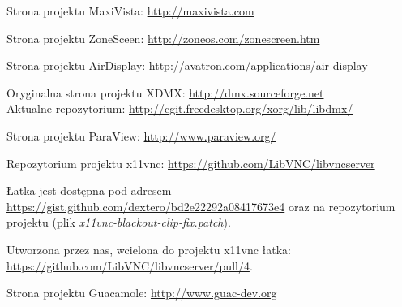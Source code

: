 \pagebreak
\begin{thebibliography}{9}

    Strona projektu MaxiVista: \url{http://maxivista.com}

    Strona projektu ZoneSceen: \url{http://zoneos.com/zonescreen.htm}

    Strona projektu AirDisplay: \url{http://avatron.com/applications/air-display}

    Oryginalna strona projektu XDMX: \url{http://dmx.sourceforge.net} \\
    Aktualne repozytorium: \url{http://cgit.freedesktop.org/xorg/lib/libdmx/}

    Strona projektu ParaView: \url{http://www.paraview.org/}

    Repozytorium projektu x11vnc: \url{https://github.com/LibVNC/libvncserver}

    Łatka jest dostępna pod adresem \url{https://gist.github.com/dextero/bd2e22292a08417673e4} oraz na repozytorium projektu (plik \emph{x11vnc-blackout-clip-fix.patch}).

    Utworzona przez nas, wcielona do projektu x11vnc łatka: \url{https://github.com/LibVNC/libvncserver/pull/4}.

    Strona projektu Guacamole: \url{http://www.guac-dev.org}

\end{thebibliography}




